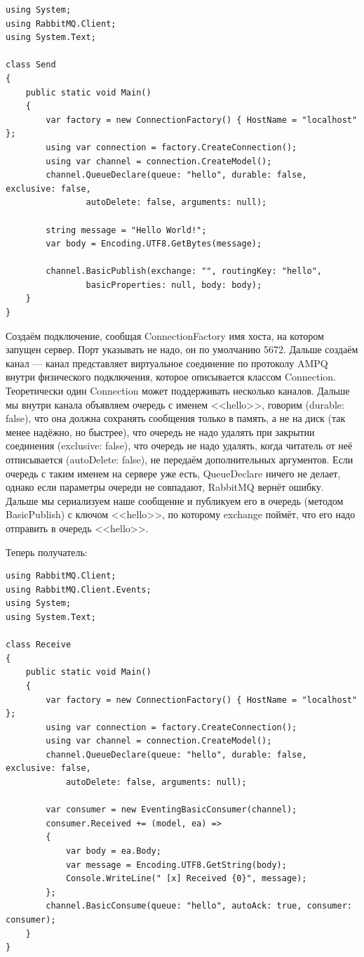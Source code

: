 \documentclass[a5paper]{article}
\begin{document}
\begin{verbatim}
using System;
using RabbitMQ.Client;
using System.Text;

class Send
{
    public static void Main()
    {
        var factory = new ConnectionFactory() { HostName = "localhost" };
        using var connection = factory.CreateConnection();
        using var channel = connection.CreateModel();
        channel.QueueDeclare(queue: "hello", durable: false, exclusive: false,
                autoDelete: false, arguments: null);

        string message = "Hello World!";
        var body = Encoding.UTF8.GetBytes(message);

        channel.BasicPublish(exchange: "", routingKey: "hello",
                basicProperties: null, body: body);
    }
}
\end{verbatim}

Создаём подключение, сообщая ConnectionFactory имя хоста, на котором запущен сервер. Порт указывать не надо, он по умолчанию 5672. Дальше создаём канал --- канал представляет виртуальное соединение по протоколу AMPQ внутри физического подключения, которое описывается классом Connection. Теоретически один Connection может поддерживать несколько каналов. Дальше мы внутри канала объявляем очередь с именем <<hello>>, говорим (durable: false), что она должна сохранять сообщения только в память, а не на диск (так менее надёжно, но быстрее), что очередь не надо удалять при закрытии соединения (exclusive: false), что очередь не надо удалять, когда читатель от неё отписывается (autoDelete: false), не передаём дополнительных аргументов. Если очередь с таким именем на сервере уже есть, QueueDeclare ничего не делает, однако если параметры очереди не совпадают, RabbitMQ вернёт ошибку. Дальше мы сериализуем наше сообщение и публикуем его в очередь (методом BasicPublish) с ключом <<hello>>, по которому exchange поймёт, что его надо отправить в очередь <<hello>>.

Теперь получатель:

\begin{verbatim}
using RabbitMQ.Client;
using RabbitMQ.Client.Events;
using System;
using System.Text;

class Receive
{
    public static void Main()
    {
        var factory = new ConnectionFactory() { HostName = "localhost" };
        using var connection = factory.CreateConnection();
        using var channel = connection.CreateModel();
        channel.QueueDeclare(queue: "hello", durable: false, exclusive: false, 
            autoDelete: false, arguments: null);

        var consumer = new EventingBasicConsumer(channel);
        consumer.Received += (model, ea) =>
        {
            var body = ea.Body;
            var message = Encoding.UTF8.GetString(body);
            Console.WriteLine(" [x] Received {0}", message);
        };
        channel.BasicConsume(queue: "hello", autoAck: true, consumer: consumer);
    }
}
\end{verbatim}
\end{document}
